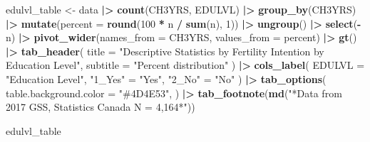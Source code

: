 \documentclass[
]{article}
\newenvironment{Shaded}{\begin{snugshade}}{\end{snugshade}}
\newcommand{\AttributeTok}[1]{\textcolor[rgb]{0.13,0.29,0.53}{#1}}
\newcommand{\DecValTok}[1]{\textcolor[rgb]{0.00,0.00,0.81}{#1}}
\newcommand{\FunctionTok}[1]{\textcolor[rgb]{0.13,0.29,0.53}{\textbf{#1}}}
\newcommand{\NormalTok}[1]{#1}
\newcommand{\OtherTok}[1]{\textcolor[rgb]{0.56,0.35,0.01}{#1}}
\newcommand{\SpecialCharTok}[1]{\textcolor[rgb]{0.81,0.36,0.00}{\textbf{#1}}}
\newcommand{\StringTok}[1]{\textcolor[rgb]{0.31,0.60,0.02}{#1}}
\begin{document}
\begin{Shaded}
\begin{Highlighting}[]
\NormalTok{edulvl\_table }\OtherTok{\textless{}{-}}\NormalTok{ data }\SpecialCharTok{|\textgreater{}} 
  \FunctionTok{count}\NormalTok{(CH3YRS, EDULVL) }\SpecialCharTok{|\textgreater{}} 
  \FunctionTok{group\_by}\NormalTok{(CH3YRS) }\SpecialCharTok{|\textgreater{}} 
  \FunctionTok{mutate}\NormalTok{(}\AttributeTok{percent =} \FunctionTok{round}\NormalTok{(}\DecValTok{100} \SpecialCharTok{*}\NormalTok{ n }\SpecialCharTok{/} \FunctionTok{sum}\NormalTok{(n), }\DecValTok{1}\NormalTok{)) }\SpecialCharTok{|\textgreater{}} 
  \FunctionTok{ungroup}\NormalTok{() }\SpecialCharTok{|\textgreater{}} 
  \FunctionTok{select}\NormalTok{(}\SpecialCharTok{{-}}\NormalTok{n) }\SpecialCharTok{|\textgreater{}} 
  \FunctionTok{pivot\_wider}\NormalTok{(}\AttributeTok{names\_from =}\NormalTok{ CH3YRS, }\AttributeTok{values\_from =}\NormalTok{ percent) }\SpecialCharTok{|\textgreater{}} 
  \FunctionTok{gt}\NormalTok{() }\SpecialCharTok{|\textgreater{}} 
  \FunctionTok{tab\_header}\NormalTok{(}
    \AttributeTok{title =} \StringTok{"Descriptive Statistics by Fertility Intention by Education Level"}\NormalTok{, }
    \AttributeTok{subtitle =} \StringTok{"Percent distribution"}
\NormalTok{  ) }\SpecialCharTok{|\textgreater{}} 
  \FunctionTok{cols\_label}\NormalTok{(}
    \AttributeTok{EDULVL =} \StringTok{"Education Level"}\NormalTok{, }
    \StringTok{"1\_Yes"} \OtherTok{=} \StringTok{"Yes"}\NormalTok{, }
    \StringTok{"2\_No"} \OtherTok{=} \StringTok{"No"}
\NormalTok{  ) }\SpecialCharTok{|\textgreater{}} 
  \FunctionTok{tab\_options}\NormalTok{(}
    \AttributeTok{table.background.color =} \StringTok{"\#4D4E53"}\NormalTok{,}
\NormalTok{  ) }\SpecialCharTok{|\textgreater{}} 
  \FunctionTok{tab\_footnote}\NormalTok{(}\FunctionTok{md}\NormalTok{(}\StringTok{"*Data from 2017 GSS, Statistics Canada}
\StringTok{                  N = 4,164*"}\NormalTok{))}

\NormalTok{edulvl\_table}
\end{Highlighting}
\end{Shaded}
\end{document}
